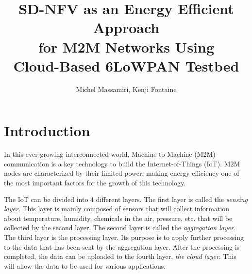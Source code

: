 \documentclass[10pt,journal,compsoc]{IEEEtran}
\begin{document}
%
\title{SD-NFV as an Energy Efficient Approach \\
       for M2M Networks Using \\
       Cloud-Based 6LoWPAN Testbed}

\author{Michel Massamiri,
        Kenji Fontaine}%



\maketitle


\IEEEdisplaynontitleabstractindextext
\IEEEpeerreviewmaketitle



\section{Introduction}\label{sec:introduction}

In this ever growing interconnected world, Machine-to-Machine (M2M) 
communication is a key technology to build the Internet-of-Things (IoT). 
M2M nodes are characterized by their limited power, making energy 
efficiency one of the most important factors for the growth of this 
technology. 

The IoT can be divided into 4 different layers. The first layer is called 
the \textit{sensing layer}. This layer is mainly composed of 
sensors that will collect information about temperature, humidity, 
chemicals in the air, pressure, etc. that will be 
collected by the second layer. The second layer is called the 
\textit{aggregation layer}. The third layer is the processing layer. Its 
purpose is to apply further processing to the data that has been sent by 
the aggregation layer. After the processing is completed, the data can 
be uploaded to the fourth layer, \textit{the cloud layer}. This will 
allow the data to be used for various applications.
\end{document}
